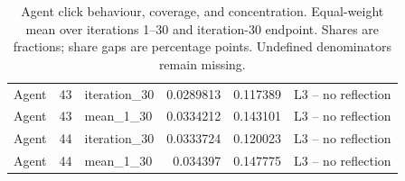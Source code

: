 \begin{table}[htbp!]
\begin{tabular}{lrlrrl}
Agent & 43 & iteration\_30 & 0.0289813 & 0.117389 & L3 -- no reflection \\
Agent & 43 & mean\_1\_30 & 0.0334212 & 0.143101 & L3 -- no reflection \\
Agent & 44 & iteration\_30 & 0.0333724 & 0.120023 & L3 -- no reflection \\
Agent & 44 & mean\_1\_30 & 0.034397 & 0.147775 & L3 -- no reflection \\
\hline
\end{tabular}
\caption{Agent click behaviour, coverage, and concentration. Equal-weight mean over iterations 1--30 and iteration-30 endpoint. Shares are fractions; share gaps are percentage points. Undefined denominators remain missing.}
\label{chap:results:tab:rq3_agents_coverage}
\end{table}
